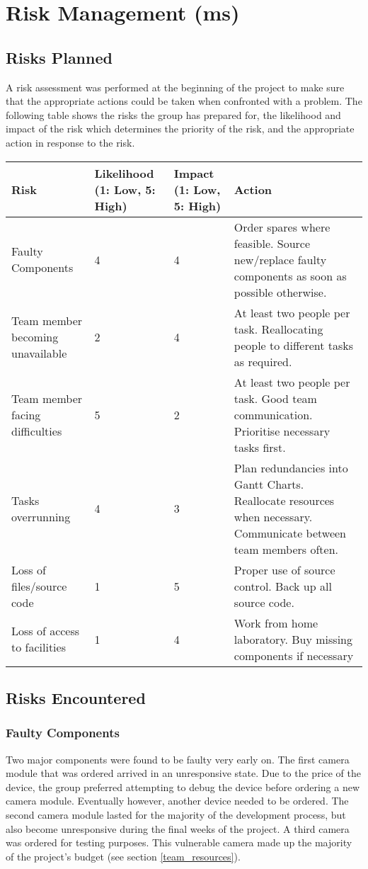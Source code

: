 \section{Risk Management (ms)}

\subsection{Risks Planned}
A risk assessment was performed at the beginning of the project to make sure that the appropriate actions could be taken when confronted with a problem. 
The following table shows the risks the group has prepared for, the likelihood and 
impact of the risk which determines the priority of the risk, and the appropriate action in response to the risk.

\begin{center}
	\begin{tabular}{ | p{4cm} | p{2cm} | p{2cm} | p{5cm} | }
	\hline
	\textbf{Risk} & \textbf{Likelihood (1: Low, 5: High)} & 
	\textbf{Impact (1: Low, 5: High)} & \textbf{Action} \\ \hline
	Faulty Components & 4 & 4 & Order spares where feasible.
	Source new/replace faulty components as soon as possible otherwise. \\ \hline
	Team member becoming unavailable & 2 & 4 & At least two people per task.
	Reallocating people to different tasks as required. \\ \hline
	Team member facing difficulties & 5 & 2 & At least two people per task.
	Good team communication. Prioritise necessary tasks first. \\ \hline
	Tasks overrunning & 4 & 3 & Plan redundancies into Gantt Charts.
	Reallocate resources when necessary. Communicate between team members often. \\ \hline
	Loss of files/source code & 1 & 5 & Proper use of source control. Back up all source code. \\ \hline
	Loss of access to facilities & 1 & 4 & Work from home laboratory. 
	Buy missing components if necessary \\
	\hline
	\end{tabular}
\end{center}

\subsection{Risks Encountered}

\subsubsection{Faulty Components}
Two major components were found to be faulty very early on. 
The first camera module that was ordered arrived in an unresponsive state. 
Due to the price of the device, the group preferred attempting to debug the device before ordering a new camera module. 
Eventually however, another device needed to be ordered. 
The second camera module lasted for the majority of the development process, but also 
become unresponsive during the final weeks of the project. A third camera was ordered for testing purposes. 
This vulnerable camera made up the majority of the project's budget (see section \ref{team_resources}).

